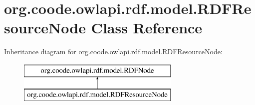 \hypertarget{classorg_1_1coode_1_1owlapi_1_1rdf_1_1model_1_1_r_d_f_resource_node}{\section{org.\-coode.\-owlapi.\-rdf.\-model.\-R\-D\-F\-Resource\-Node Class Reference}
\label{classorg_1_1coode_1_1owlapi_1_1rdf_1_1model_1_1_r_d_f_resource_node}
}
Inheritance diagram for org.\-coode.\-owlapi.\-rdf.\-model.\-R\-D\-F\-Resource\-Node\-:\begin{figure}[H]
\begin{center}
\leavevmode
\includegraphics[height=2.000000cm]{classorg_1_1coode_1_1owlapi_1_1rdf_1_1model_1_1_r_d_f_resource_node}
\end{center}
\end{figure}
